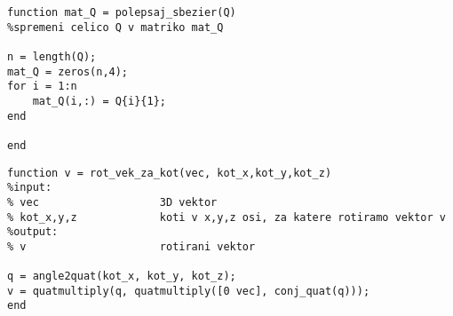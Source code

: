\documentclass[12pt,a4paper,twoside]{article}
\theoremstyle{definition} %
\theoremstyle{plain} %
\numberwithin{equation}{section}  %
\begin{document}
\begin{lstlisting}[caption = {polepsaj\_sbezier}]
function mat_Q = polepsaj_sbezier(Q)
%spremeni celico Q v matriko mat_Q

n = length(Q);
mat_Q = zeros(n,4);
for i = 1:n
    mat_Q(i,:) = Q{i}{1};
end

end
\end{lstlisting}

\begin{lstlisting}[caption = {rot\_vek\_za\_kot}]
function v = rot_vek_za_kot(vec, kot_x,kot_y,kot_z)
%input:
% vec                   3D vektor
% kot_x,y,z             koti v x,y,z osi, za katere rotiramo vektor v
%output:
% v                     rotirani vektor

q = angle2quat(kot_x, kot_y, kot_z);
v = quatmultiply(q, quatmultiply([0 vec], conj_quat(q)));
end
\end{lstlisting}

\begin{lstlisting}[caption = {}]

\end{lstlisting}

\begin{lstlisting}[caption = {}]

\end{lstlisting}
\end{document}
